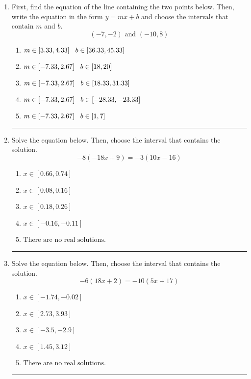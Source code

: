 \documentclass[14pt]{extbook}
\newcommand{\litem}[1]{\item#1\hspace*{-1cm}\rule{\textwidth}{0.4pt}}
\begin{document}
\begin{enumerate}
\litem{
First, find the equation of the line containing the two points below. Then, write the equation in the form $ y=mx+b $ and choose the intervals that contain $m$ and $b$.\[ (-7, -2) \text{ and } (-10, 8) \]\begin{enumerate}[label=\Alph*.]
\item \( m \in [3.33, 4.33] \hspace*{3mm} b \in [36.33, 45.33] \)
\item \( m \in [-7.33, 2.67] \hspace*{3mm} b \in [18, 20] \)
\item \( m \in [-7.33, 2.67] \hspace*{3mm} b \in [18.33, 31.33] \)
\item \( m \in [-7.33, 2.67] \hspace*{3mm} b \in [-28.33, -23.33] \)
\item \( m \in [-7.33, 2.67] \hspace*{3mm} b \in [1, 7] \)

\end{enumerate} }
\litem{
Solve the equation below. Then, choose the interval that contains the solution.\[ -8(-18x + 9) = -3(10x -16) \]\begin{enumerate}[label=\Alph*.]
\item \( x \in [0.66, 0.74] \)
\item \( x \in [0.08, 0.16] \)
\item \( x \in [0.18, 0.26] \)
\item \( x \in [-0.16, -0.11] \)
\item \( \text{There are no real solutions.} \)

\end{enumerate} }
\litem{
Solve the equation below. Then, choose the interval that contains the solution.\[ -6(18x + 2) = -10(5x + 17) \]\begin{enumerate}[label=\Alph*.]
\item \( x \in [-1.74, -0.02] \)
\item \( x \in [2.73, 3.93] \)
\item \( x \in [-3.5, -2.9] \)
\item \( x \in [1.45, 3.12] \)
\item \( \text{There are no real solutions.} \)


\end{enumerate}}
\end{enumerate}
\end{document}
